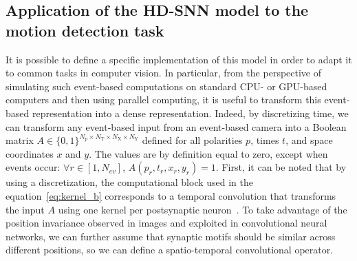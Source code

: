 \documentclass[default]{sn-jnl}%
\theoremstyle{thmstyleone}%
\theoremstyle{thmstyletwo}%
\theoremstyle{thmstylethree}%
\newcommand{\numevent}{N_{ev}} %
\newcommand{\Npol}{N_\text{p}} %
\newcommand{\arank}{r} %
\newcommand{\polev}{p} %
\newcommand{\Nx}{N_\text{X}}
\newcommand{\Ny}{N_\text{Y}}
\newcommand{\Ntime}{N_\text{T}}
\begin{document}
\subsection{Application of the HD-SNN model to the motion detection task}
%
It is possible to define a specific implementation of this model in order to adapt it to common tasks in computer vision. In particular, from the perspective of simulating such event-based computations on standard CPU- or GPU-based computers and then using parallel computing, it is useful to transform this event-based representation into a dense representation. Indeed, by discretizing time, we can transform any event-based input from an event-based camera into a Boolean matrix $A \in \{0, 1 \}^{\Npol \times \Ntime \times \Nx \times \Ny}$ defined for all polarities $p$, times $t$, and space coordinates $x$ and $y$. The values are by definition equal to zero, except when events occur: $\forall \arank \in [1,\numevent]$, $A(\polev_\arank, t_\arank, x_\arank, y_\arank)=1$. First, it can be noted that by using a discretization, the computational block used in the equation~\eqref{eq:kernel_b} corresponds to a temporal convolution that transforms the input $A$ using one kernel per postsynaptic neuron~\citep{grimaldi_learning_2022}. To take advantage of the position invariance observed in images and exploited in convolutional neural networks, we can further assume that synaptic motifs should be similar across different positions, so we can define a spatio-temporal convolutional operator.
\end{document}
